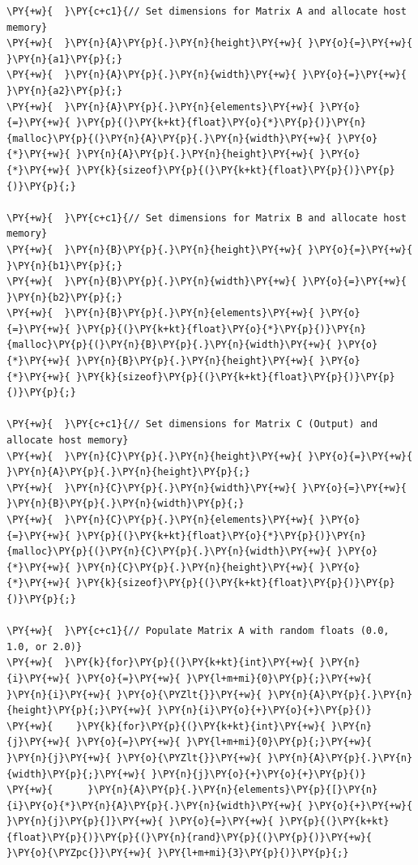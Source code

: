 \begin{Verbatim}[label=\makebox{\url{https://github.com/lucabaldini/cmepda/tree/master/slides/latex/snippets/MatrixMultiplication_shared.cu}},commandchars=\\\{\}]
\PY{+w}{  }\PY{c+c1}{// Set dimensions for Matrix A and allocate host memory}
\PY{+w}{  }\PY{n}{A}\PY{p}{.}\PY{n}{height}\PY{+w}{ }\PY{o}{=}\PY{+w}{ }\PY{n}{a1}\PY{p}{;}
\PY{+w}{  }\PY{n}{A}\PY{p}{.}\PY{n}{width}\PY{+w}{ }\PY{o}{=}\PY{+w}{ }\PY{n}{a2}\PY{p}{;}
\PY{+w}{  }\PY{n}{A}\PY{p}{.}\PY{n}{elements}\PY{+w}{ }\PY{o}{=}\PY{+w}{ }\PY{p}{(}\PY{k+kt}{float}\PY{o}{*}\PY{p}{)}\PY{n}{malloc}\PY{p}{(}\PY{n}{A}\PY{p}{.}\PY{n}{width}\PY{+w}{ }\PY{o}{*}\PY{+w}{ }\PY{n}{A}\PY{p}{.}\PY{n}{height}\PY{+w}{ }\PY{o}{*}\PY{+w}{ }\PY{k}{sizeof}\PY{p}{(}\PY{k+kt}{float}\PY{p}{)}\PY{p}{)}\PY{p}{;}

\PY{+w}{  }\PY{c+c1}{// Set dimensions for Matrix B and allocate host memory}
\PY{+w}{  }\PY{n}{B}\PY{p}{.}\PY{n}{height}\PY{+w}{ }\PY{o}{=}\PY{+w}{ }\PY{n}{b1}\PY{p}{;}
\PY{+w}{  }\PY{n}{B}\PY{p}{.}\PY{n}{width}\PY{+w}{ }\PY{o}{=}\PY{+w}{ }\PY{n}{b2}\PY{p}{;}
\PY{+w}{  }\PY{n}{B}\PY{p}{.}\PY{n}{elements}\PY{+w}{ }\PY{o}{=}\PY{+w}{ }\PY{p}{(}\PY{k+kt}{float}\PY{o}{*}\PY{p}{)}\PY{n}{malloc}\PY{p}{(}\PY{n}{B}\PY{p}{.}\PY{n}{width}\PY{+w}{ }\PY{o}{*}\PY{+w}{ }\PY{n}{B}\PY{p}{.}\PY{n}{height}\PY{+w}{ }\PY{o}{*}\PY{+w}{ }\PY{k}{sizeof}\PY{p}{(}\PY{k+kt}{float}\PY{p}{)}\PY{p}{)}\PY{p}{;}

\PY{+w}{  }\PY{c+c1}{// Set dimensions for Matrix C (Output) and allocate host memory}
\PY{+w}{  }\PY{n}{C}\PY{p}{.}\PY{n}{height}\PY{+w}{ }\PY{o}{=}\PY{+w}{ }\PY{n}{A}\PY{p}{.}\PY{n}{height}\PY{p}{;}
\PY{+w}{  }\PY{n}{C}\PY{p}{.}\PY{n}{width}\PY{+w}{ }\PY{o}{=}\PY{+w}{ }\PY{n}{B}\PY{p}{.}\PY{n}{width}\PY{p}{;}
\PY{+w}{  }\PY{n}{C}\PY{p}{.}\PY{n}{elements}\PY{+w}{ }\PY{o}{=}\PY{+w}{ }\PY{p}{(}\PY{k+kt}{float}\PY{o}{*}\PY{p}{)}\PY{n}{malloc}\PY{p}{(}\PY{n}{C}\PY{p}{.}\PY{n}{width}\PY{+w}{ }\PY{o}{*}\PY{+w}{ }\PY{n}{C}\PY{p}{.}\PY{n}{height}\PY{+w}{ }\PY{o}{*}\PY{+w}{ }\PY{k}{sizeof}\PY{p}{(}\PY{k+kt}{float}\PY{p}{)}\PY{p}{)}\PY{p}{;}

\PY{+w}{  }\PY{c+c1}{// Populate Matrix A with random floats (0.0, 1.0, or 2.0)}
\PY{+w}{  }\PY{k}{for}\PY{p}{(}\PY{k+kt}{int}\PY{+w}{ }\PY{n}{i}\PY{+w}{ }\PY{o}{=}\PY{+w}{ }\PY{l+m+mi}{0}\PY{p}{;}\PY{+w}{ }\PY{n}{i}\PY{+w}{ }\PY{o}{\PYZlt{}}\PY{+w}{ }\PY{n}{A}\PY{p}{.}\PY{n}{height}\PY{p}{;}\PY{+w}{ }\PY{n}{i}\PY{o}{+}\PY{o}{+}\PY{p}{)}
\PY{+w}{    }\PY{k}{for}\PY{p}{(}\PY{k+kt}{int}\PY{+w}{ }\PY{n}{j}\PY{+w}{ }\PY{o}{=}\PY{+w}{ }\PY{l+m+mi}{0}\PY{p}{;}\PY{+w}{ }\PY{n}{j}\PY{+w}{ }\PY{o}{\PYZlt{}}\PY{+w}{ }\PY{n}{A}\PY{p}{.}\PY{n}{width}\PY{p}{;}\PY{+w}{ }\PY{n}{j}\PY{o}{+}\PY{o}{+}\PY{p}{)}
\PY{+w}{      }\PY{n}{A}\PY{p}{.}\PY{n}{elements}\PY{p}{[}\PY{n}{i}\PY{o}{*}\PY{n}{A}\PY{p}{.}\PY{n}{width}\PY{+w}{ }\PY{o}{+}\PY{+w}{ }\PY{n}{j}\PY{p}{]}\PY{+w}{ }\PY{o}{=}\PY{+w}{ }\PY{p}{(}\PY{k+kt}{float}\PY{p}{)}\PY{p}{(}\PY{n}{rand}\PY{p}{(}\PY{p}{)}\PY{+w}{ }\PY{o}{\PYZpc{}}\PY{+w}{ }\PY{l+m+mi}{3}\PY{p}{)}\PY{p}{;}


\end{Verbatim}
